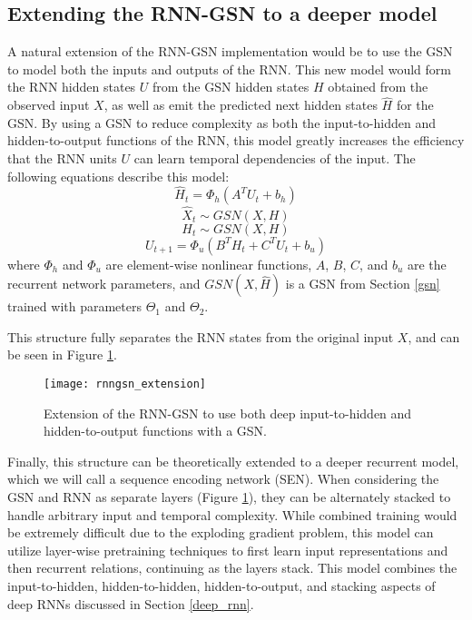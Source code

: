 \subsection{Extending the RNN-GSN to a deeper model}
A natural extension of the RNN-GSN implementation would be to use the GSN to model both the inputs and outputs of the RNN. This new model would form the RNN hidden states $U$ from the GSN hidden states $H$ obtained from the observed input $X$, as well as emit the predicted next hidden states $\hat{H}$ for the GSN. By using a GSN to reduce complexity as both the input-to-hidden and hidden-to-output functions of the RNN, this model greatly increases the efficiency that the RNN units $U$ can learn temporal dependencies of the input. The following equations describe this model:
\begin{equation}
	\hat{H}_t = \Phi_{h}(A^TU_{t} + b_h)
\end{equation}
\begin{equation}
	\hat{X}_t \sim GSN(X,H)
\end{equation}
\begin{equation}
	H_t \sim GSN(X,H)
\end{equation}
\begin{equation}
	U_{t+1} = \Phi_{u}(B^TH_t + C^TU_t + b_u)
\end{equation}
where \(\Phi_h\) and \(\Phi_u\) are element-wise nonlinear functions,  $A$, $B$, $C$, and $b_u$ are the recurrent network parameters, and $GSN(X,\hat{H})$ is a GSN from Section \ref{gsn} trained with parameters $\Theta_1$ and $\Theta_2$.

This structure fully separates the RNN states from the original input $X$, and can be seen in Figure \ref{fig:rnngsn2}.

\begin{figure}[h!]
  \centering
    \texttt{[image: rnngsn\_extension]}
\caption{Extension of the RNN-GSN to use both deep input-to-hidden and hidden-to-output functions with a GSN.}\label{fig:rnngsn2}
\end{figure}

Finally, this structure can be theoretically extended to a deeper recurrent model, which we will call a sequence encoding network (SEN). When considering the GSN and RNN as separate layers (Figure \ref{fig:rnngsn2}), they can be alternately stacked to handle arbitrary input and temporal complexity. While combined training would be extremely difficult due to the exploding gradient problem, this model can utilize layer-wise pretraining techniques to first learn input representations and then recurrent relations, continuing as the layers stack. This model combines the input-to-hidden, hidden-to-hidden, hidden-to-output, and stacking aspects of deep RNNs discussed in Section \ref{deep_rnn}.

